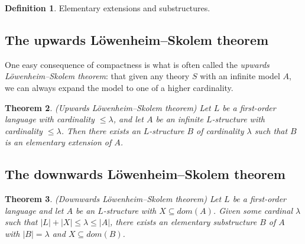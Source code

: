 \documentclass[10pt, a4paper, oneside]{article}
\newtheorem{thm}{Theorem}[section]
\theoremstyle{definition}
\newtheorem{dfn}[thm]{Definition}
\theoremstyle{remark}
\theoremstyle{plain}
\begin{document}
\begin{dfn}
    Elementary extensions and substructures.
\end{dfn}

\subsection{The upwards Löwenheim--Skolem theorem}

One easy consequence of compactness is what is often called the \emph{upwards
Löwenheim--Skolem theorem}: that given any theory $S$ with an infinite model
$A$, we can always expand the model to one of a higher cardinality.

\begin{thm}
    (Upwards Löwenheim--Skolem theorem) Let $L$ be a first-order language with
    cardinality $\leq \lambda$, and let $A$ be an infinite $L$-structure with
    cardinality $\leq \lambda$. Then there exists an $L$-structure $B$ of
    cardinality $\lambda$ such that $B$ is an elementary extension of $A$.
\end{thm}

\subsection{The downwards Löwenheim--Skolem theorem}

\begin{thm}
    (Downwards Löwenheim--Skolem theorem) Let $L$ be a first-order language and
    let $A$ be an $L$-structure with $X \subseteq dom(A)$. Given some cardinal
    $\lambda$ such that $|L| + |X| \leq \lambda \leq |A|$, there exists an
    elementary substructure $B$ of $A$ with $|B| = \lambda$ and
    $X \subseteq dom(B)$.
\end{thm}




\end{document}
